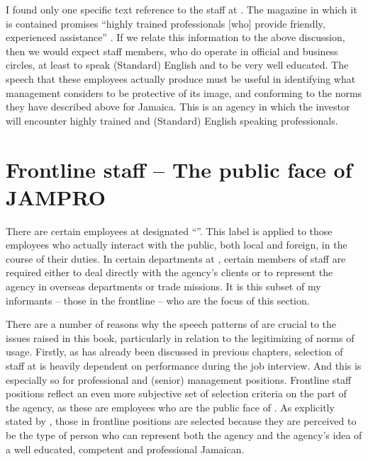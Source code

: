 I found only one specific text reference to the staff at .  The magazine in which it is contained promises “highly trained professionals [who] provide friendly, experienced assistance” \citep[10]{JAMPRO1996}.  If we relate this information to the above discussion, then we would expect  staff members, who do operate in official and business circles, at least to speak (Standard) English and to be very well educated.  The speech that these employees actually produce must be useful in identifying what  management considers to be protective of its image, and conforming to the norms they have described above for Jamaica.  This is an agency in which the investor will encounter highly trained and (Standard) English speaking professionals.

\section{Frontline staff – The public face of JAMPRO}\label{sec:4.2}

There are certain employees at  designated “”.  This label is applied to those employees who actually interact with the public, both local and foreign, in the course of their duties.  In certain departments at , certain members of staff are required either to deal directly with the agency’s clients or to represent the agency in overseas departments or trade missions.  It is this subset of my informants – those in the frontline – who are the focus of this section.  

There are a number of reasons why the speech patterns of  are crucial to the issues raised in this book, particularly in relation to the legitimizing of norms of  usage.  Firstly, as has already been discussed in previous chapters, selection of staff at  is heavily dependent on performance during the job interview.  And this is especially so for professional and (senior) management positions.  Frontline staff positions reflect an even more subjective set of selection criteria on the part of the agency, as these are employees who are the public face of .  As explicitly stated by , those in frontline positions are selected because they are perceived to be the type of person who can represent both the agency and the agency’s idea of a well educated, competent and professional Jamaican.  

